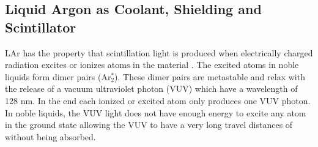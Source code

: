 \documentclass[encoding=utf8,british]{tumphthesis}
\begin{document}
\subsection{Liquid Argon as Coolant, Shielding and Scintillator} 
\label{sec:LArcoolant}

LAr has the property that scintillation light is produced when electrically charged radiation excites or ionizes atoms in the material \cite{olsen_improvements_nodate}.
The excited atoms in noble liquids form dimer pairs (Ar$^*_2$).
These dimer pairs are metastable and relax with the release of a vacuum ultraviolet photon (VUV)  which have a wavelength of 128 nm.
In the end each ionized or excited atom only produces one VUV photon.
In noble liquids, the VUV light does not have enough energy to excite any atom in the ground state allowing the VUV to have a very long travel distances of without being absorbed.
\\
\end{document}
